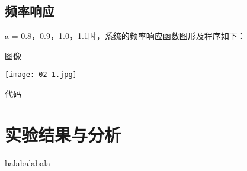 \documentclass[withcover]{zjureport}
\begin{document}
  \subsection{频率响应}
    a = 0.8，0.9，1.0，1.1时，系统的频率响应函数图形及程序如下：
    \begin{clause}
      \item 图像
      \begin{center}
        \texttt{[image: 02-1.jpg]}
      \end{center}
      \item 代码
      
    \end{clause}

\section{实验结果与分析}

  balabalabala
\end{document}
